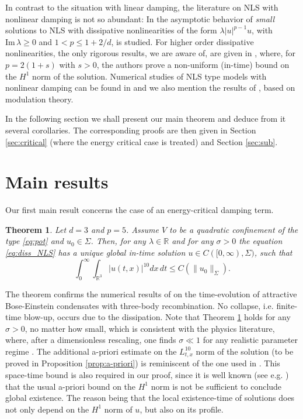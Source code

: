 \documentclass[a4paper,leqno]{amsart}
\theoremstyle{plain}
\newtheorem{theorem}{Theorem}[section]
\theoremstyle{definition}
\numberwithin{equation}{section}
\begin{document}
In contrast to the situation with linear damping,
the literature on NLS with nonlinear damping is not so abundant: In \cite{KiShi, Shi} 
the asymptotic behavior of \emph{small} solutions to NLS with dissipative nonlinearities 
of the form $\lambda |u|^{p-1}u$, with ${\mathrm{Im}} \, {\lambda {\geqslant} 0}$ and $1<p{\leqslant} 1+2/d$, is studied.
For higher order dissipative nonlinearities, the only rigorous results, we are aware of, 
are given in \cite{PSS}, where, for $p=2(1+s)$ with $s>0$, the authors prove a non-uniform (in-time) bound on the $H^1$
norm of the solution. Numerical studies of NLS type models with nonlinear damping can be found in \cite{BJ, BJM} and we also mention 
the results of \cite{Fi}, based on modulation theory. 

In the following section we shall present our main theorem and deduce from it several corollaries. 
The corresponding proofs are then given in Section \ref{sec:critical}  (where the energy critical case is treated)
and Section \ref{sec:sub}.

\section{Main results} \label{sec:results}

Our first main result concerns the case of an energy-critical damping term.

\begin{theorem}\label{th:critical}
Let $d=3$ and $p = 5$. Assume $V$ to be a quadratic confinement of the type \eqref{eq:pot} and $u_0 \in \Sigma$. Then, for any $\lambda \in {{\mathbb R}}$ and for any $\sigma >0$ the equation \eqref{eq:diss_NLS} has a unique
global in-time solution $u \in C([0, \infty), \Sigma)$, such that
$$
\int_0^\infty \int_{{{\mathbb R}}^3}|u(t,x)|^{10} d x \, d t {\leqslant} C( \|u_0\|_{\Sigma}).
$$
\end{theorem}
The theorem confirms the numerical results of \cite{BJM} on the time-evolution of attractive Bose-Einstein condensates with three-body recombination. No collapse, i.e. finite-time blow-up, occurs due to the dissipation. 
Note that Theorem \ref{th:critical} holds for any $\sigma>0$, no matter how small, which is consistent with the physics literature,
where, after a dimensionless rescaling, 
one finds $\sigma \ll 1$ for any realistic parameter regime \cite{A, BJM, KMS}.
The additional a-priori estimate on the $L^{10}_{t,x}$ norm of the solution (to be proved in Proposition \ref{prop:a-priori}) is reminiscent of the one used in \cite{CKSTT}.
This space-time bound is also required in our proof, since it is well known (see e.g. \cite{Caz}) that
the usual a-priori bound on the $H^1$ norm is not be sufficient to conclude global existence. The reason being that the local existence-time of solutions does not only depend 
on the $H^1$ norm of $u$, but also on its profile.
\end{document}

